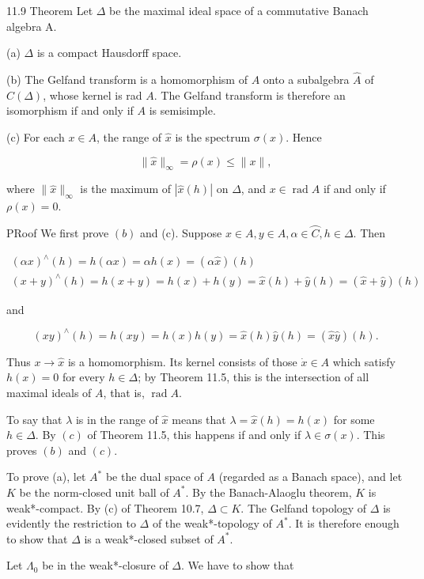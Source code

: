 \documentclass[10pt]{article}
\begin{document}
11.9 Theorem Let $\Delta$ be the maximal ideal space of a commutative Banach algebra A.

(a) $\Delta$ is a compact Hausdorff space.

(b) The Gelfand transform is a homomorphism of $A$ onto a subalgebra $\hat{A}$ of $C(\Delta)$, whose kernel is rad $A$. The Gelfand transform is therefore an isomorphism if and only if $A$ is semisimple.

(c) For each $x \in A$, the range of $\hat{x}$ is the spectrum $\sigma(x)$. Hence

$$
\|\hat{x}\|_{\infty}=\rho(x) \leq\|x\|,
$$

where $\|\hat{x}\|_{\infty}$ is the maximum of $|\hat{x}(h)|$ on $\Delta$, and $x \in \operatorname{rad} A$ if and only if $\rho(x)=0$.

PRoof We first prove $(b)$ and (c). Suppose $x \in A, y \in A, \alpha \in \overparen{C}, h \in \Delta$. Then

$$
\begin{gathered}
(\alpha x)^{\wedge}(h)=h(\alpha x)=\alpha h(x)=(\alpha \hat{x})(h) \\
(x+y)^{\wedge}(h)=h(x+y)=h(x)+h(y)=\hat{x}(h)+\hat{y}(h)=(\hat{x}+\hat{y})(h)
\end{gathered}
$$

and

$$
(x y)^{\wedge}(h)=h(x y)=h(x) h(y)=\hat{x}(h) \hat{y}(h)=(\hat{x} \hat{y})(h) .
$$

Thus $x \rightarrow \hat{x}$ is a homomorphism. Its kernel consists of those $\dot{x} \in A$ which satisfy $h(x)=0$ for every $h \in \Delta$; by Theorem 11.5, this is the intersection of all maximal ideals of $A$, that is, $\operatorname{rad} A$.

To say that $\lambda$ is in the range of $\hat{x}$ means that $\lambda=\hat{x}(h)=h(x)$ for some $h \in \Delta$. By $(c)$ of Theorem 11.5, this happens if and only if $\lambda \in \sigma(x)$. This proves $(b)$ and $(c)$.

To prove (a), let $A^{*}$ be the dual space of $A$ (regarded as a Banach space), and let $K$ be the norm-closed unit ball of $A^{*}$. By the Banach-Alaoglu theorem, $K$ is weak*-compact. By (c) of Theorem 10.7, $\Delta \subset K$. The Gelfand topology of $\Delta$ is evidently the restriction to $\Delta$ of the weak*-topology of $A^{*}$. It is therefore enough to show that $\Delta$ is a weak*-closed subset of $A^{*}$.

Let $\Lambda_{0}$ be in the weak*-closure of $\Delta$. We have to show that
\end{document}
